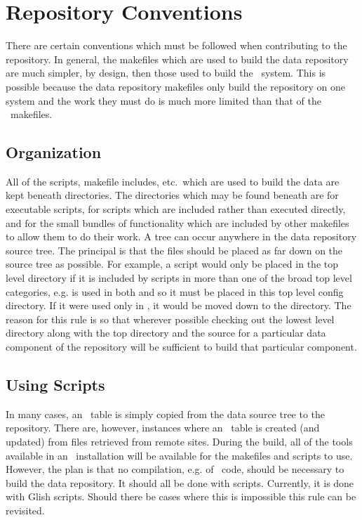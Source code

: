 \section{Repository Conventions}
\label{data repository conventions}

There are certain conventions which must be followed when contributing to
the repository. In general, the makefiles which are used to build the
data repository are much simpler, by design, then those used to build
the \aipspp\ system. This is possible because the data repository makefiles
only build the repository on one system and the work they must do is much
more limited than that of the \aipspp\ makefiles.

\subsection*{Organization}
All of the scripts, makefile includes, etc.~which are used to build the data
are kept beneath  directories. The directories which may be
found beneath  are  for executable scripts,
 for scripts which are included rather than executed directly,
and  for the small bundles of functionality which are
included by other makefiles to allow them to do their work. A 
tree can occur anywhere in the data repository source tree. The principal
is that the  files should be placed as far down on the
source tree as possible. For example, a script would only be placed in
the top level  directory if it is included
by scripts in more than one of the broad top level categories, e.g.
 is used in both  and
 so it must be placed in this top level config directory.
If it were used only in , it would be moved down to
the  directory. The reason for this
rule is so that wherever possible checking out the lowest level 
directory along with the top  directory and the source for a
particular data component of the repository will be sufficient to build
that particular component.

\subsection*{Using Scripts}
In many cases, an \aipspp\ table is simply copied from the data source
tree to the repository. There are, however, instances where an
\aipspp\ table is created (and updated) from files retrieved from remote sites.
During the build, all of the tools available in an \aipspp\ installation
will be available for the makefiles and scripts to use. However,
the plan is that no compilation, e.g. of \cplusplus\ code, should be
necessary to build the data repository. It should all be done with
scripts. Currently, it is done with Glish scripts. Should there be
cases where this is impossible this rule can be revisited.

